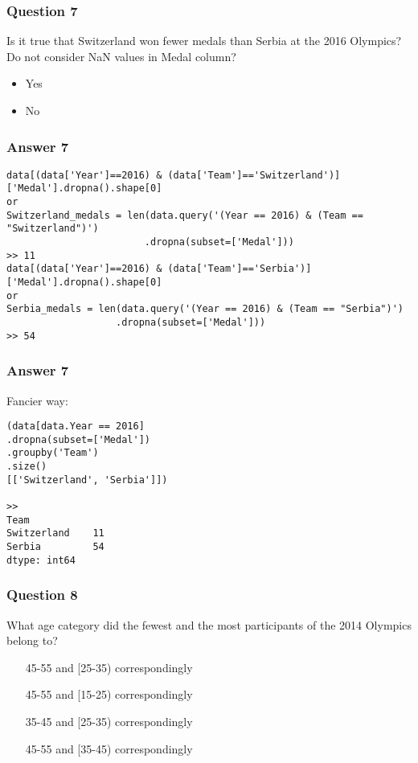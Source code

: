 \begin{frame}[fragile]\frametitle{Question 7}	
Is it true that Switzerland won fewer medals than Serbia at the 2016 Olympics? Do not consider NaN values in Medal column?
\begin{itemize}
\item Yes
\item No
\end{itemize}

\end{frame}

\begin{frame}[fragile]\frametitle{Answer 7}
\begin{lstlisting}
data[(data['Year']==2016) & (data['Team']=='Switzerland')]['Medal'].dropna().shape[0]
or
Switzerland_medals = len(data.query('(Year == 2016) & (Team == "Switzerland")')
                        .dropna(subset=['Medal']))
>> 11
data[(data['Year']==2016) & (data['Team']=='Serbia')]['Medal'].dropna().shape[0]
or
Serbia_medals = len(data.query('(Year == 2016) & (Team == "Serbia")')
                   .dropna(subset=['Medal']))
>> 54
\end{lstlisting}

\end{frame}

\begin{frame}[fragile]\frametitle{Answer 7}
Fancier way:
\begin{lstlisting}
(data[data.Year == 2016]
.dropna(subset=['Medal']) 
.groupby('Team') 
.size()
[['Switzerland', 'Serbia']])

>> 
Team
Switzerland    11
Serbia         54
dtype: int64
\end{lstlisting}

\end{frame}

\begin{frame}[fragile]\frametitle{Question 8}	
What age category did the fewest and the most participants of the 2014 Olympics belong to?
\begin{itemize}
\item [45-55] and [25-35) correspondingly
\item [45-55] and [15-25) correspondingly
\item [35-45] and [25-35) correspondingly
\item [45-55] and [35-45) correspondingly
\end{itemize}

\end{frame}

